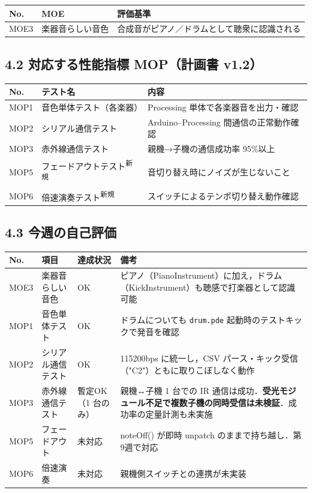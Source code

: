 \documentclass[a4paper,11pt]{ltjsarticle}
\providecommand{\％}{\%}
\begin{document}
\begin{longtable}{|p{1.2cm}|p{4cm}|p{8cm}|}
\hline
\rowcolor[gray]{0.9}
No. & MOE & 評価基準 \\
\hline
MOE3 & 楽器音らしい音色 & 合成音がピアノ／ドラムとして聴衆に認識される \\
\hline
\end{longtable}

\subsection*{4.2 対応する性能指標 MOP（計画書 v1.2）}

\begin{longtable}{|p{1.2cm}|p{3.6cm}|p{9.0cm}|}
\hline
\rowcolor[gray]{0.9}
No. & テスト名 & 内容 \\
\hline
MOP1 & 音色単体テスト（各楽器） & Processing 単体で各楽器音を出力・確認 \\
\hline
MOP2 & シリアル通信テスト & Arduino--Processing 間通信の正常動作確認 \\
\hline
MOP3 & 赤外線通信テスト & 親機→子機の通信成功率 95\％以上 \\
\hline
MOP5 & フェードアウトテスト\textsuperscript{新規} & 音切り替え時にノイズが生じないこと \\
\hline
MOP6 & 倍速演奏テスト\textsuperscript{新規} & スイッチによるテンポ切り替え動作確認 \\
\hline
\end{longtable}

\subsection*{4.3 今週の自己評価}

\begin{longtable}{|p{1.2cm}|p{3.5cm}|p{2cm}|p{8cm}|}
\hline
\rowcolor[gray]{0.9}
No. & 項目 & 達成状況 & 備考 \\
\hline
MOE3 & 楽器音らしい音色 & OK & ピアノ（PianoInstrument）に加え，ドラム（KickInstrument）も聴感で打楽器として認識可能 \\
\hline
MOP1 & 音色単体テスト & OK & ドラムについても \texttt{drum.pde} 起動時のテストキックで発音を確認 \\
\hline
MOP2 & シリアル通信テスト & OK & 115200bps に統一し，CSV パース・キック受信（"C2"）ともに取りこぼしなく動作 \\
\hline
MOP3 & 赤外線通信テスト & 暫定OK（1 台のみ） & 親機↔子機 1 台での IR 通信は成功．\textbf{受光モジュール不足で複数子機の同時受信は未検証}．成功率の定量計測も未実施 \\
\hline
MOP5 & フェードアウト & 未対応 & noteOff() が即時 unpatch のままで持ち越し．第9週で対応 \\
\hline
MOP6 & 倍速演奏 & 未対応 & 親機側スイッチとの連携が未実装 \\
\hline
\end{longtable}
\end{document}
